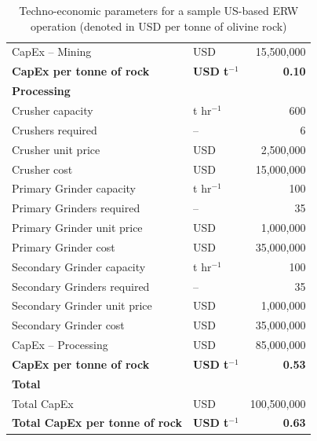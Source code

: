 \begin{table}[h!]
{\begin{tabular}{llr}
CapEx -- Mining         & USD       & 15{,}500{,}000 \\
\textbf{CapEx per tonne of rock}         & \textbf{USD t$^{-1}$}     & \textbf{0.10} \\ \hline

\multicolumn{3}{l}{\textbf{Processing}} \\ \hline
Crusher capacity        & t hr$^{-1}$       & 600 \\
Crushers required       & --        & 6 \\
Crusher unit price      & USD       & 2{,}500{,}000 \\
Crusher cost            & USD       & 15{,}000{,}000 \\

Primary Grinder capacity      & t hr$^{-1}$       & 100 \\
Primary Grinders required     & --        & 35 \\
Primary Grinder unit price    & USD       & 1{,}000{,}000 \\
Primary Grinder cost          & USD       & 35{,}000{,}000 \\

Secondary Grinder capacity      & t hr$^{-1}$       & 100 \\
Secondary Grinders required     & --        & 35 \\
Secondary Grinder unit price    & USD       & 1{,}000{,}000 \\
Secondary Grinder cost          & USD       & 35{,}000{,}000 \\

CapEx -- Processing     & USD       & 85{,}000{,}000 \\
\textbf{CapEx per tonne of rock}         & \textbf{USD t$^{-1}$}     & \textbf{0.53} \\ \hline

\multicolumn{3}{l}{\textbf{Total}} \\ \hline
Total CapEx             & USD       & 100{,}500{,}000 \\
\textbf{Total CapEx per tonne of rock}   & \textbf{USD t$^{-1}$}     & \textbf{0.63} \\ \hline

\end{tabular}}
\caption{Techno-economic parameters for a sample US-based ERW operation (denoted in USD per tonne of olivine rock)}
\end{table}

\clearpage
